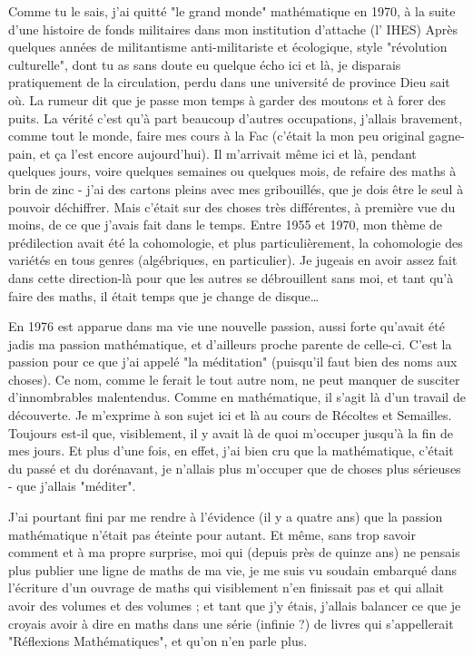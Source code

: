 Comme tu le sais, j'ai quitté "le grand monde" mathématique en 1970, à la suite d'une histoire de fonds militaires dans mon institution d'attache (l' IHES) Après quelques années de militantisme anti-militariste et écologique, style "révolution culturelle", dont tu as sans doute eu quelque écho ici et là, je disparais pratiquement de la circulation, perdu dans une université de province Dieu sait où. La rumeur dit que je passe mon temps à garder des moutons et à forer des puits. La vérité c'est qu'à part beaucoup d'autres occupations, j'allais bravement, comme tout le monde, faire mes cours à la Fac (c'était la mon peu original gagne-pain, et ça l'est encore aujourd'hui). Il m'arrivait même ici et là, pendant quelques jours, voire quelques semaines ou quelques mois, de refaire des maths à brin de zinc - j'ai des cartons pleins avec mes gribouillés, que je dois être le seul à pouvoir déchiffrer. Mais c'était sur des choses très différentes, à première vue du moins, de ce que j'avais fait dans le temps. Entre 1955 et 1970, mon thème de prédilection avait été la cohomologie, et plus particulièrement, la cohomologie des variétés en tous genres (algébriques, en particulier). Je jugeais en avoir assez fait dans cette direction-là pour que les autres se débrouillent sans moi, et tant qu'à faire des maths, il était temps que je change de disque\ldots

En 1976 est apparue dans ma vie une nouvelle passion, aussi forte qu'avait été jadis ma passion mathématique, et d'ailleurs proche parente de celle-ci. C'est la passion pour ce que j'ai appelé "la méditation" (puisqu'il faut bien des noms aux choses). Ce nom, comme le ferait le tout autre nom, ne peut manquer de susciter d'innombrables malentendus. Comme en mathématique, il s'agit là d'un travail de découverte. Je m'exprime à son sujet ici et là au cours de Récoltes et Semailles. Toujours est-il que, visiblement, il y avait là de quoi m'occuper jusqu'à la fin de mes jours. Et plus d'une fois, en effet, j'ai bien cru que la mathématique, c'était du passé et du dorénavant, je n'allais plus m'occuper que de choses plus sérieuses - que j'allais "méditer".

J'ai pourtant fini par me rendre à l'évidence (il y a quatre ans) que la passion mathématique n'était pas éteinte pour autant. Et même, sans trop savoir comment et à ma propre surprise, moi qui (depuis près de quinze ans) ne pensais plus publier une ligne de maths de ma vie, je me suis vu soudain embarqué dans l'écriture d'un ouvrage de maths qui visiblement n'en finissait pas et qui allait avoir des volumes et des volumes ; et tant que j'y étais, j'allais balancer ce que je croyais avoir à dire en maths dans une série (infinie ?) de livres qui s'appellerait "Réflexions Mathématiques", et qu'on n'en parle plus.

